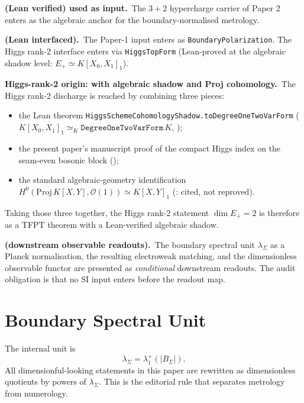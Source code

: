 \begin{tfptstatusbox}
\textbf{ (Lean verified) used as input.}\ The $3+2$
hypercharge carrier of Paper 2 enters as the algebraic anchor
for the boundary-normalised metrology.

\smallskip
\textbf{ (Lean interfaced).}\ The Paper-1 input enters
as \texttt{BoundaryPolarization}. The Higgs rank-2 interface
enters via \texttt{HiggsTopForm} (Lean-proved at the algebraic
shadow level: $E_+ \simeq K[X_0,X_1]_1$).

\smallskip
\textbf{Higgs-rank-2 origin:  with  algebraic
shadow and  Proj cohomology.}\ The Higgs rank-2
discharge is reached by combining three pieces:
\begin{itemize}[leftmargin=1.6em, itemsep=0pt]
    \item the Lean theorem
        \texttt{HiggsSchemeCohomologyShadow.toDegreeOneTwoVarForm}
        ($K[X_0,X_1]_1 \simeq_K \texttt{DegreeOneTwoVarForm}\,K$,
        );
    \item the present paper's manuscript proof of the compact
        Higgs index on the seam-even bosonic block ();
    \item the standard algebraic-geometry identification
        $H^0(\mathrm{Proj}\,K[X,Y], \mathcal O(1)) \simeq K[X,Y]_1$
        (: cited, not reproved).
\end{itemize}
Taking those three together, the Higgs rank-2 statement
$\dim E_+ = 2$ is therefore  as a TFPT theorem with a
Lean-verified algebraic shadow.

\smallskip
\textbf{ (downstream observable readouts).}\ The
boundary spectral unit $\lambda_\Sigma$ as a Planck
normalisation, the resulting electroweak matching, and the
dimensionless observable functor are presented as
\emph{conditional} downstream readouts. The audit obligation
is that no SI input enters before the readout map.
\end{tfptstatusbox}

\tableofcontents

\section{Boundary Spectral Unit}

The internal unit is
\[
\lambda_\Sigma=\lambda_1^+(|B_\Sigma|).
\]
All dimensionful-looking statements in this paper are rewritten as dimensionless quotients by
powers of $\lambda_\Sigma$. This is the editorial rule that separates metrology from numerology.

